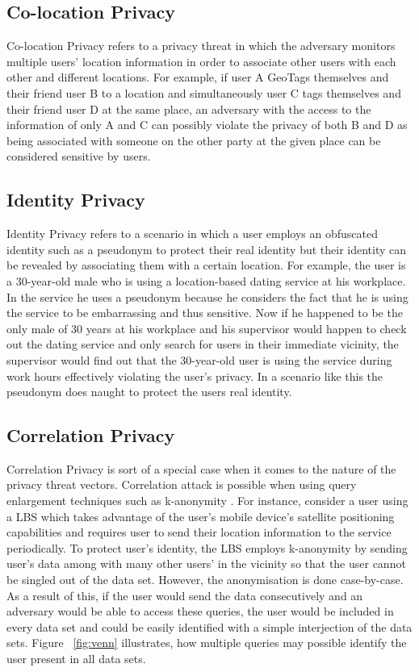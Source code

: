 \documentclass[english]{tktltiki2}
\theoremstyle{definition}
\theoremstyle{remark}
\begin{document}
\subsection{Co-location Privacy}
Co-location Privacy refers to a privacy threat in which the adversary monitors multiple users' location information in order to associate other users with each other and different locations. For example, if user A GeoTags themselves and their friend user B to a location and simultaneously user C tags themselves and their friend user D at the same place, an adversary with the access to the information of only A and C can possibly violate the privacy of both B and D as being associated with someone on the other party at the given place can be considered sensitive by users.

\subsection{Identity Privacy}
Identity Privacy refers to a scenario in which a user employs an obfuscated identity such as a pseudonym to protect their real identity but their identity can be revealed by associating them with a certain location. For example, the user is a 30-year-old male who is using a location-based dating service at his workplace. In the service he uses a pseudonym because he considers the fact that he is using the service to be embarrassing and thus sensitive. Now if he happened to be the only male of 30 years at his workplace and his supervisor would happen to check out the dating service and only search for users in their immediate vicinity, the supervisor would find out that the 30-year-old user is using the service during work hours effectively violating the user's privacy. In a scenario like this the pseudonym does naught to protect the users real identity.

\subsection{Correlation Privacy}
Correlation Privacy is sort of a special case when it comes to the nature of the privacy threat vectors. Correlation attack is possible when using query enlargement techniques such as k-anonymity \cite{Sweeney:2002:KAM:774544.774552}. For instance, consider a user using a LBS which takes advantage of the user's mobile device's satellite positioning capabilities and requires user to send their location information to the service periodically. To protect user's identity, the LBS employs k-anonymity by sending user's data among with many other users' in the vicinity so that the user cannot be singled out of the data set. However, the anonymisation is done case-by-case. As a result of this, if the user would send the data consecutively and an adversary would be able to access these queries, the user would be included in every data set and could be easily identified with a simple interjection of the data sets. Figure ~\ref{fig:venn} illustrates, how multiple queries may possible identify the user present in all data sets.
\end{document}
